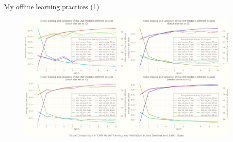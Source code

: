 \documentclass{beamer}
\begin{document}
	\begin{frame}[fragile]{My offline learning practices (1)}
		\begin{figure}[!htb]
			\centering\includegraphics[width=.85\linewidth]{images/deep_learning_0.png}
			\endminipage\hfill
			\endminipage
		\end{figure}
	\end{frame}
	
\end{document}
